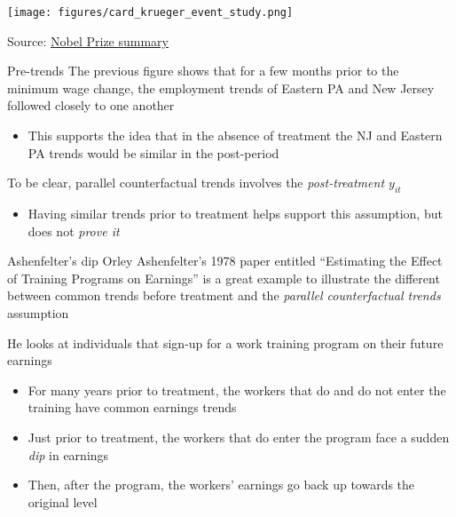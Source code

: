 \documentclass[aspectratio=169,t,11pt,table]{beamer}
\begin{document}
\begin{frame}{}
  \begin{center}
    \texttt{[image: figures/card\_krueger\_event\_study.png]}
    
    Source: \href{https://www.nobelprize.org/uploads/2021/10/fig3_ek_en_21_effectIncreasingMinimunWage.pdf}{Nobel Prize summary} 
  \end{center}
\end{frame}

\begin{frame}{Pre-trends}
  The previous figure shows that for a few months prior to the minimum wage change, the employment trends of Eastern PA and New Jersey followed closely to one another
  \begin{itemize}
    \item This supports the idea that in the absence of treatment the NJ and Eastern PA trends would be similar in the post-period
  \end{itemize}

  \pause
  \bigskip
  To be clear, parallel counterfactual trends involves the \emph{post-treatment $y_{it}$}
  \begin{itemize}
    \item Having similar trends prior to treatment helps support this assumption, but does not \emph{prove it}
  \end{itemize}
\end{frame}

\begin{frame}{Ashenfelter's dip}
  Orley Ashenfelter's 1978 paper entitled ``Estimating the Effect of Training Programs on Earnings'' is a great example to illustrate the different between common trends before treatment and the \emph{parallel counterfactual trends} assumption

  \pause
  \bigskip
  He looks at individuals that sign-up for a work training program on their future earnings
  \begin{itemize}
    \item For many years prior to treatment, the workers that do and do not enter the training have common earnings trends
    
    \item Just prior to treatment, the workers that do enter the program face a sudden \emph{dip} in earnings
    
    \item Then, after the program, the workers' earnings go back up towards the original level
  \end{itemize}
\end{frame}
\end{document}
